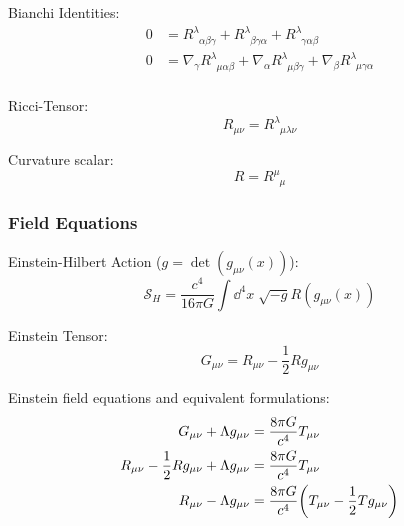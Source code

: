 			\noindent
			Bianchi Identities:
			\begin{equation}
				\begin{aligned}
					0 &= R^{\lambda}_{\phantom{\lambda}\alpha\beta\gamma} + R^{\lambda}_{\phantom{\lambda}\beta\gamma\alpha} + R^{\lambda}_{\phantom{\lambda}\gamma\alpha\beta} \\
					0 &= \nabla_\gamma R^{\lambda}_{\phantom{\lambda}\mu\alpha\beta} + \nabla_\alpha R^{\lambda}_{\phantom{\lambda}\mu\beta\gamma} + \nabla_\beta R^{\lambda}_{\phantom{\lambda}\mu\gamma\alpha} \\
				\end{aligned}
			\end{equation}

			\noindent
			Ricci-Tensor:
			\begin{equation}
				R_{\mu\nu} = R^\lambda_{\phantom{\lambda}\mu\lambda\nu}
			\end{equation}

			\noindent
			Curvature scalar:
			\begin{equation}
				R = R^\mu_{\phantom{\mu}\mu}
			\end{equation}

		\subsubsection{Field Equations}
			\noindent
			Einstein-Hilbert Action ($g=\det(g_{\mu\nu}(x))$):
			\begin{equation}
				\mathcal{S}_H = \frac{c^4}{16\pi G} \int\dd^4 x\; \sqrt{-g} R(g_{\mu\nu}(x))
			\end{equation}

			\noindent
			Einstein Tensor:
			\begin{equation}
				G_{\mu\nu} = R_{\mu\nu} - \frac{1}{2} R g_{\mu\nu}
			\end{equation}

			\noindent
			Einstein field equations and equivalent formulations:
			\begin{equation}
				\begin{aligned}
					G_{\mu\nu} + \Lambda g_{\mu\nu} &= \frac{8\pi G}{c^4} T_{\mu\nu} \\
					R_{\mu\nu} - \frac{1}{2} R g_{\mu\nu} + \Lambda g_{\mu\nu} &= \frac{8\pi G}{c^4} T_{\mu\nu} \\
					R_{\mu\nu} - \Lambda g_{\mu\nu}&= \frac{8\pi G}{c^4} \qty( T_{\mu\nu} - \frac{1}{2} T g_{\mu\nu} ) \\
				\end{aligned}
			\end{equation}

